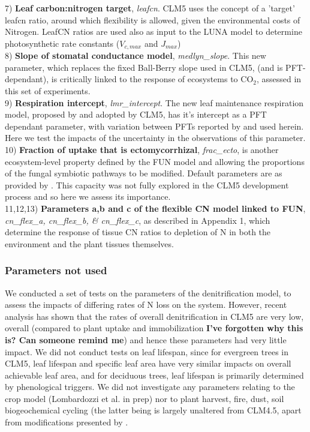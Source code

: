 \documentclass[draft,linenumbers]{agujournal}
\begin{document}
7) \textbf{Leaf carbon:nitrogen target}, \emph{leafcn}. CLM5 uses the concept of a 'target' leafcn ratio, around which flexibility is allowed, given the environmental costs of Nitrogen. LeafCN ratios are used also as input to the LUNA model to determine photosynthetic rate constants ($V_{c,max}$ and $J_{max}$) \\

8) \textbf{Slope of stomatal conductance model}, \emph{medlyn\_slope}. This new parameter, which replaces the fixed Ball-Berry slope used in CLM5, (and is PFT-dependant), is critically linked to the response of ecosystems to CO$_{2}$, assessed in this set of experiments. \\

9) \textbf{Respiration intercept}, \emph{lmr\_intercept}. The new leaf maintenance respiration model, proposed by \cite{atkin2015} and adopted by CLM5, has it's intercept as a PFT dependant parameter, with variation between PFTs reported by \cite{atkin2015} and used herein. Here we test the impacts of the uncertainty in the observations of this parameter. \\

10) \textbf{Fraction of uptake that is ectomycorrhizal}, \emph{frac\_ecto}, is another ecosystem-level property defined by the FUN model and allowing the proportions of the fungal symbiotic pathways to be modified. Default parameters are as provided by \cite{shi2016}. This capacity was not fully explored in the CLM5 development process and so here we assess its importance. \\

11,12,13) \textbf{Parameters a,b and c of the flexible CN model linked to FUN}, \emph{cn\_flex\_a, cn\_flex\_b, \& cn\_flex\_c}, as described in Appendix 1, which determine the response of tissue CN ratios to depletion of N in both the environment and the plant tissues themselves.


\subsubsection{Parameters not used}

We conducted a set of tests on the parameters of the denitrification model, to assess the impacts of differing rates of N loss on the system. However, recent analysis has shown that the rates of overall denitrification in CLM5 are very low, overall (compared to plant uptake and immobilization \textbf{I've forgotten why this is? Can someone remind me}) and hence these parameters had very little impact. We did not conduct tests on leaf lifespan, since for evergreen trees in CLM5, leaf lifespan and specific leaf area have very similar impacts on overall achievable leaf area, and for deciduous trees, leaf lifespan is primarily determined by phenological triggers. We did not investigate any parameters relating to the crop model (Lombardozzi et al. in prep) nor to plant harvest, fire, dust, soil biogeochemical cycling (the latter being is largely unaltered from CLM4.5, \cite{koven2013} apart from modifications presented by \cite{lawrence}.
\end{document}

